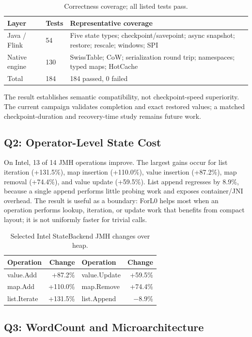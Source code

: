 \documentclass[sigconf]{acmart}
\newcommand{\forlzero}{ForL0\xspace}
\newcommand{\system}{\forlzero}
\begin{document}
\begin{table}[t]
\caption{Correctness coverage; all listed tests pass.}
\label{tab:correctness}
\centering
\small
\begin{tabularx}{\columnwidth}{L{2.7cm}C{1.0cm}Y}
\toprule
Layer & Tests & Representative coverage \tabularnewline
\midrule
Java / Flink & 54 & Five state types; checkpoint/savepoint; async snapshot; restore; rescale; windows; SPI \tabularnewline
Native engine & 130 & SwissTable; CoW; serialization round trip; namespaces; typed maps; HotCache \tabularnewline
\midrule
Total & 184 & 184 passed, 0 failed \tabularnewline
\bottomrule
\end{tabularx}
\end{table}

The result establishes semantic compatibility, not checkpoint-speed superiority. The current campaign validates completion and exact restored values; a matched checkpoint-duration and recovery-time study remains future work.

\subsection{Q2: Operator-Level State Cost}

On Intel, 13 of 14 JMH operations improve. The largest gains occur for list iteration (+131.5\%), map insertion (+110.0\%), value insertion (+87.2\%), map removal (+74.4\%), and value update (+59.5\%). List append regresses by 8.9\%, because a single append performs little probing work and exposes container/JNI overhead. The result is useful as a boundary: \system helps most when an operation performs lookup, iteration, or update work that benefits from compact layout; it is not uniformly faster for trivial calls.

\begin{table}[t]
\caption{Selected Intel StateBackend JMH changes over heap.}
\label{tab:jmh}
\centering
\small
\begin{tabular}{l r@{\qquad}l r}
\toprule
Operation & Change & Operation & Change \\
\midrule
value.Add & +87.2\% & value.Update & +59.5\% \\
map.Add & +110.0\% & map.Remove & +74.4\% \\
list.Iterate & +131.5\% & list.Append & $-$8.9\% \\
\bottomrule
\end{tabular}
\end{table}

\subsection{Q3: WordCount and Microarchitecture}
\end{document}
